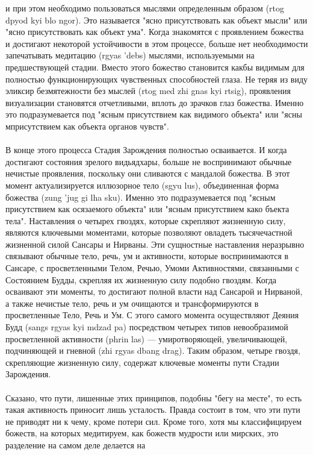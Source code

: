 \begin{siderules}
и при этом необходимо пользоваться мыслями определенным образом (rtog dpyod kyi blo ngor).
Это называется "ясно присутствовать как объект мысли" или "ясно присутствовать как объект ума".
Когда знакомятся с проявлением божества и достигают некоторой устойчивости в этом
процессе, больше нет необходимости запечатывать медитацию (rgyas 'debs) мыслями,
используемыми на предшествующей стадии. Вместо этого божество становится какбы
видимым для полностью функционирующих чувственных способностей глаза. Не теряя из
виду эликсир безмятежности без мыслей (rtog med zhi gnas kyi rtsig), проявления
визуализации становятся отчетливыми, вплоть до зрачков глаз божества. Именно это
подразумевается под "ясным присутствием как видимого объекта" или "ясны мприсутствием
как объекта органов чувств".\\
\\
В конце этого процесса Стадия Зарождения полностью осваивается. И когда достигают
состояния зрелого видьядхары, больше не воспринимают обычные нечистые проявления,
поскольку они сливаются с мандалой божества. В этот момент актуализируется иллюзорное
тело (sgyu lus), объединенная форма божества (zung 'jug gi lha sku). Именно это
подразумевается под "ясным присутствием как осязаемого объекта" или "ясным присутствием како бъекта тела".
Наставления о четырех гвоздях, которые скрепляют жизненную силу, являются ключевыми
моментами, которые позволяют овладеть тысячечастной жизненной силой Сансары и
Нирваны. Эти сущностные наставления неразрывно связывают обычные тело, речь, ум и
активности, которые воспринимаются в Сансаре, с просветленными Телом, Речью, Умоми
Активностями, связанными с Состоянием Будды, скрепляя их жизненную силу подобно
гвоздям. Когда осваивают эти моменты, то достигают полной власти над Сансарой и
Нирваной, а также нечистые тело, речь и ум очищаются и трансформируются в
просветленные Тело, Речь и Ум. С этого самого момента осуществляют Деяния Будд (sangs
rgyas kyi mdzad pa) посредством четырех типов невообразимой просветленной активности
(phrin las) — умиротворяющей, увеличивающей, подчиняющей и гневной (zhi rgyas dbang
drag). Таким образом, четыре гвоздя, скрепляющие жизненную силу, содержат ключевые
моменты пути Стадии Зарождения.\\
\\
Сказано, что пути, лишенные этих принципов, подобны "бегу на месте", то есть такая
активность приносит лишь усталость. Правда состоит в том, что эти пути не приводят ни к
чему, кроме потери сил. Кроме того, хотя мы классифицируем божеств, на которых
медитируем, как божеств мудрости или мирских, это разделение на самом деле делается на

\end{siderules}
